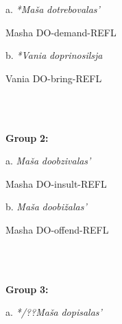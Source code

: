 \documentclass[output=paper,modfonts, nonflat]{langsci/langscibook}
\begin{document}
\begin{styleinnerExample}
\begin{styleinnerExample}
  a.  \textit{*Maša}   \textit{dotrebovalas’} 
\end{styleinnerExample}

\begin{styleinnerExample}
     Masha   DO-demand-REFL\\\end{styleinnerExample}

\begin{styleinnerExample}
  b.  \textit{*Vania}   \textit{doprinosilsja} 
\end{styleinnerExample}

\begin{styleinnerExample}
      Vania   DO-bring-REFL
\end{styleinnerExample}

\begin{styleinnerExample}
\ea%
    \label{ex:key:45}
    \gll\\
        \\
    \glt
    \z

          \textbf{Group} \textbf{2:}
\end{styleinnerExample}

\begin{styleinnerExample}
  a.  \textit{Maša}   \textit{doobzivalas’} 
\end{styleinnerExample}

\begin{styleinnerExample}
    Masha DO-insult-REFL\\\end{styleinnerExample}

\begin{styleinnerExample}
  b.  \textit{Maša}  \textit{doobižalas’} 
\end{styleinnerExample}

\begin{styleinnerExample}
    Masha DO-offend-REFL
\end{styleinnerExample}

\begin{styleinnerExample}
\ea%
    \label{ex:key:46}
    \gll\\
        \\
    \glt
    \z

          \textbf{Group} \textbf{3:}
\end{styleinnerExample}

\begin{styleinnerExample}
  a.  \textit{*/??Maša} \textit{dopisalas’}  
\end{styleinnerExample}


\end{styleinnerExample}
\end{document}
